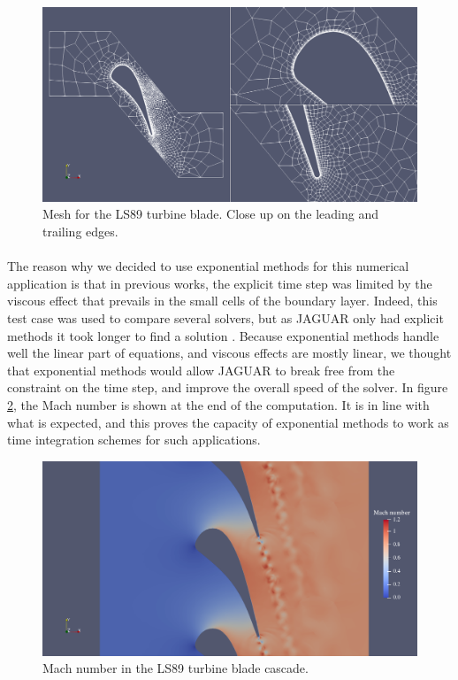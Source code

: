       \begin{figure}
        \centering
        \includegraphics[width=\textwidth]{figures/ls89_mesh.png}
        \caption{Mesh for the LS89 turbine blade. Close up on the leading and trailing edges.}
        \label{fig:ls89_mesh}
      \end{figure}

      \paragraph{}
      The reason why we decided to use exponential methods for this numerical application is that in previous works, the explicit time step was limited by the viscous effect that prevails in the small cells of the boundary layer.
      Indeed, this test case was used to compare several solvers, but as JAGUAR only had explicit methods it took longer to find a solution \cite{BrunetCronerMinotEtAl2018}.
      Because exponential methods handle well the linear part of equations, and viscous effects are mostly linear, we thought that exponential methods would allow JAGUAR to break free from the constraint on the time step, and improve the overall speed of the solver.
      In figure \ref{fig:ls89_field}, the Mach number is shown at the end of the computation.
      It is in line with what is expected, and this proves the capacity of exponential methods to work as time integration schemes for such applications.

      \begin{figure}
        \centering
        \includegraphics[width=\textwidth]{figures/ls89_field.png}
        \caption{Mach number in the LS89 turbine blade cascade.}
        \label{fig:ls89_field}
      \end{figure}

